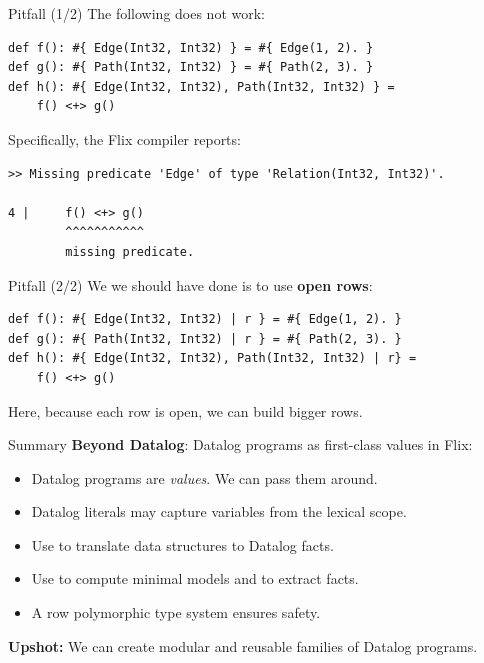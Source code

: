 \begin{frame}[fragile]{Pitfall (1/2)}
The following does not work: 

\begin{lstlisting}[language=flix, xleftmargin=0.8cm]
def f(): #{ Edge(Int32, Int32) } = #{ Edge(1, 2). }
def g(): #{ Path(Int32, Int32) } = #{ Path(2, 3). }
def h(): #{ Edge(Int32, Int32), Path(Int32, Int32) } = 
    f() <+> g()
\end{lstlisting}

\pause Specifically, the Flix compiler reports:

\begin{lstlisting}[language=flix, xleftmargin=0.8cm]
>> Missing predicate 'Edge' of type 'Relation(Int32, Int32)'.

4 |     f() <+> g()
        ^^^^^^^^^^^
        missing predicate.
\end{lstlisting}
\end{frame}

\begin{frame}[fragile]{Pitfall (2/2)}
We we should have done is to use \textbf{open rows}:

\begin{lstlisting}[language=flix, xleftmargin=0.8cm]
def f(): #{ Edge(Int32, Int32) | r } = #{ Edge(1, 2). }
def g(): #{ Path(Int32, Int32) | r } = #{ Path(2, 3). }
def h(): #{ Edge(Int32, Int32), Path(Int32, Int32) | r} = 
    f() <+> g()
\end{lstlisting}

Here, because each row is open, we can build bigger rows.
\end{frame}

\begin{frame}{Summary}
\textbf{Beyond Datalog}: Datalog programs as first-class values in Flix:

\begin{itemize}
    \item Datalog programs are \emph{values}. We can pass them around.
    \item Datalog literals may capture variables from the lexical scope.
    \item Use \Code{inject} to translate data structures to Datalog facts.
    \item Use \Code{query} to compute minimal models and to extract facts.
    \item A row polymorphic type system ensures safety.
\end{itemize}

\textbf{Upshot:} We can create modular and reusable families of Datalog programs.
\end{frame}

